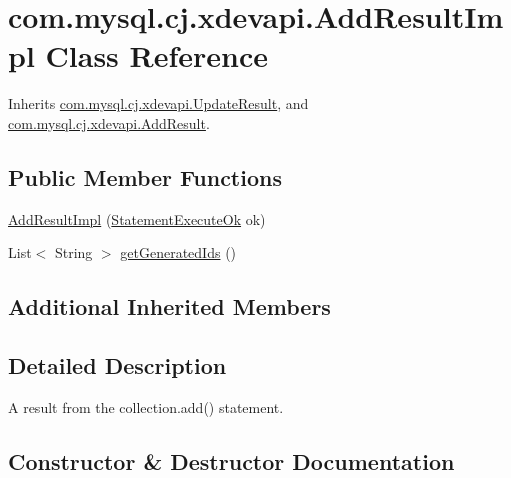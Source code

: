 \hypertarget{classcom_1_1mysql_1_1cj_1_1xdevapi_1_1_add_result_impl}{}\section{com.\+mysql.\+cj.\+xdevapi.\+Add\+Result\+Impl Class Reference}
\label{classcom_1_1mysql_1_1cj_1_1xdevapi_1_1_add_result_impl}


Inherits \mbox{\hyperlink{classcom_1_1mysql_1_1cj_1_1xdevapi_1_1_update_result}{com.\+mysql.\+cj.\+xdevapi.\+Update\+Result}}, and \mbox{\hyperlink{interfacecom_1_1mysql_1_1cj_1_1xdevapi_1_1_add_result}{com.\+mysql.\+cj.\+xdevapi.\+Add\+Result}}.

\subsection*{Public Member Functions}
\begin{DoxyCompactItemize}
\item 
\mbox{\hyperlink{classcom_1_1mysql_1_1cj_1_1xdevapi_1_1_add_result_impl_a3d93550eca35d5f57f713855afad2149}{Add\+Result\+Impl}} (\mbox{\hyperlink{classcom_1_1mysql_1_1cj_1_1protocol_1_1x_1_1_statement_execute_ok}{Statement\+Execute\+Ok}} ok)
\item 
List$<$ String $>$ \mbox{\hyperlink{classcom_1_1mysql_1_1cj_1_1xdevapi_1_1_add_result_impl_a61db638035bc38725440e27d51dc1ef8}{get\+Generated\+Ids}} ()
\end{DoxyCompactItemize}
\subsection*{Additional Inherited Members}


\subsection{Detailed Description}
A result from the collection.\+add() statement. 

\subsection{Constructor \& Destructor Documentation}
\mbox{\label{classcom_1_1mysql_1_1cj_1_1xdevapi_1_1_add_result_impl_a3d93550eca35d5f57f713855afad2149}} 
